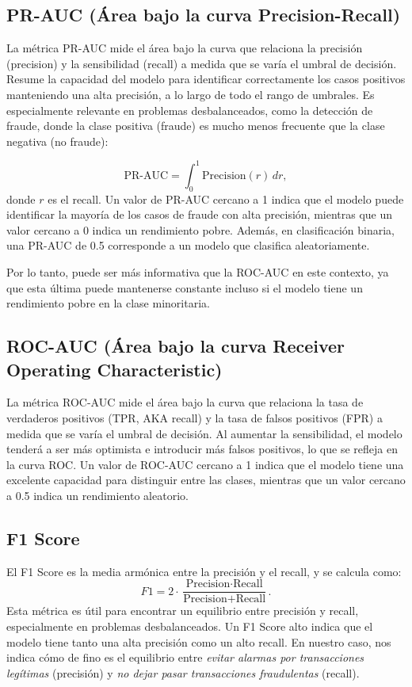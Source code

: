 \documentclass{article}
\begin{document}
\begin{appendix}
    \subsection{PR-AUC (Área bajo la curva Precision-Recall)}

    La métrica PR-AUC mide el área bajo la curva que relaciona la precisión (precision) y la sensibilidad (recall) a medida que se varía el umbral de decisión. Resume la capacidad del modelo para identificar correctamente los casos positivos manteniendo una alta precisión, a lo largo de todo el rango de umbrales. Es especialmente relevante en problemas desbalanceados, como la detección de fraude, donde la clase positiva (fraude) es mucho menos frecuente que la clase negativa (no fraude):

    \[
        \text{PR-AUC} = \int_0^1 \text{Precision}(r) \, dr,
    \]
    donde \( r \) es el recall. Un valor de PR-AUC cercano a 1 indica que el modelo puede identificar la mayoría de los casos de fraude con alta precisión, mientras que un valor cercano a 0 indica un rendimiento pobre. Además, en clasificación binaria, una PR-AUC de 0.5 corresponde a un modelo que clasifica aleatoriamente.

    Por lo tanto, puede ser más informativa que la ROC-AUC en este contexto, ya que esta última puede mantenerse constante incluso si el modelo tiene un rendimiento pobre en la clase minoritaria.

    \subsection{ROC-AUC (Área bajo la curva Receiver Operating Characteristic)}

    La métrica ROC-AUC mide el área bajo la curva que relaciona la tasa de verdaderos positivos (TPR, AKA recall) y la tasa de falsos positivos (FPR) a medida que se varía el umbral de decisión. Al aumentar la sensibilidad, el modelo tenderá a ser más optimista e introducir más falsos positivos, lo que se refleja en la curva ROC. Un valor de ROC-AUC cercano a 1 indica que el modelo tiene una excelente capacidad para distinguir entre las clases, mientras que un valor cercano a 0.5 indica un rendimiento aleatorio.

    \subsection{F1 Score}

    El F1 Score es la media armónica entre la precisión y el recall, y se calcula como:
    \[
        F1 = 2 \cdot \frac{\text{Precision} \cdot \text{Recall}}{\text{Precision} + \text{Recall}}.
    \]
    Esta métrica es útil para encontrar un equilibrio entre precisión y recall, especialmente en problemas desbalanceados. Un F1 Score alto indica que el modelo tiene tanto una alta precisión como un alto recall. En nuestro caso, nos indica cómo de fino es el equilibrio entre \textit{evitar alarmas por transacciones legítimas} (precisión) y \textit{no dejar pasar transacciones fraudulentas} (recall).


\end{appendix}
\end{document}
